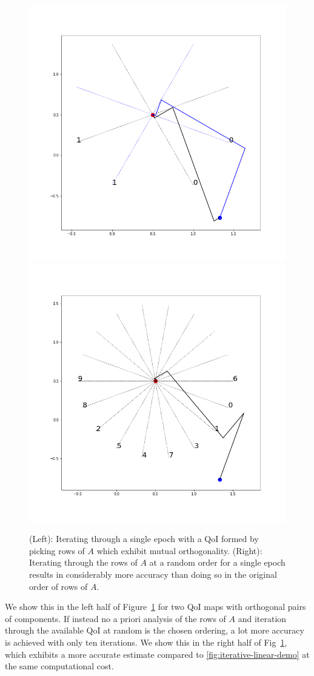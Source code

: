 \begin{figure}
  \centering
  \includegraphics[width=0.475\linewidth]{examples/iterative/10D-firstepoch-pair-smart.png}
  \includegraphics[width=0.475\linewidth]{examples/iterative/10D-firstepoch-rand.png}
  \caption{
  (Left): Iterating through a single epoch with a QoI formed by picking rows of $A$ which exhibit mutual orthogonality.
  (Right): Iterating through the rows of $A$ at a random order for a single epoch results in considerably more accuracy than doing so in the original order of rows of $A$.
  }
  \label{fig:iterative-linear-demo-smart}
\end{figure}


We show this in the left half of Figure~\ref{fig:iterative-linear-demo-smart} for two QoI maps with orthogonal pairs of components.
If instead no a priori analysis of the rows of $A$ and iteration through the available QoI at random is the chosen ordering, a lot more accuracy is achieved with only ten iterations.
We show this in the right half of Fig~\ref{fig:iterative-linear-demo-smart}, which exhibits a more accurate estimate compared to \ref{fig:iterative-linear-demo} at the same computational cost.


